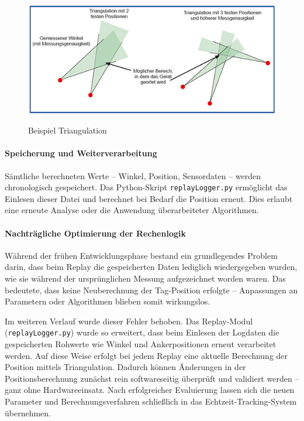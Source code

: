 \documentclass[a4paper, 12pt]{article} %
\begin{document}
\begin{figure}[H]
    \includegraphics[width=1\linewidth]{images/1906_abbildung1 (1)}\\[1ex]
    \centering
    \caption{Beispiel Triangulation}
    \label{ABBILDUNG}
\end{figure}

\paragraph{Speicherung und Weiterverarbeitung}

Sämtliche berechneten Werte – Winkel, Position, Sensordaten – werden chronologisch gespeichert. Das Python-Skript \texttt{replayLogger.py} 
ermöglicht das Einlesen dieser Datei und berechnet bei Bedarf die Position erneut. Dies erlaubt eine erneute Analyse oder die Anwendung überarbeiteter 
Algorithmen.

\paragraph{Nachträgliche Optimierung der Rechenlogik}

Während der frühen Entwicklungsphase bestand ein grundlegendes Problem darin, dass beim Replay die gespeicherten Daten lediglich wiedergegeben wurden, wie sie während der ursprünglichen Messung aufgezeichnet worden waren. Das bedeutete, dass keine Neuberechnung der Tag-Position erfolgte – Anpassungen an Parametern oder Algorithmen blieben somit wirkungslos. 

Im weiteren Verlauf wurde dieser Fehler behoben. Das Replay-Modul (\texttt{replayLogger.py}) wurde so erweitert, dass beim Einlesen der Logdaten die gespeicherten Rohwerte wie Winkel und Ankerpositionen erneut verarbeitet werden. Auf diese Weise erfolgt bei jedem Replay eine aktuelle Berechnung der Position mittels Triangulation. Dadurch können Änderungen in der Positionsberechnung zunächst rein softwareseitig überprüft und validiert werden – ganz ohne Hardwareeinsatz. Nach erfolgreicher Evaluierung lassen sich die neuen Parameter und Berechnungsverfahren schließlich in das Echtzeit-Tracking-System übernehmen.
\end{document}
